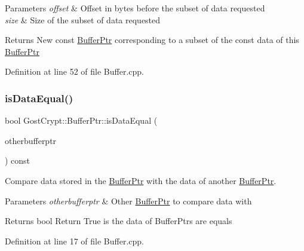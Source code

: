 \begin{DoxyParams}{Parameters}
{\em offset} & Offset in bytes before the subset of data requested \\
\hline
{\em size} & Size of the subset of data requested \\
\hline
\end{DoxyParams}
\begin{DoxyReturn}{Returns}
New const \hyperlink{class_gost_crypt_1_1_buffer_ptr}{Buffer\+Ptr} corresponding to a subset of the const data of this \hyperlink{class_gost_crypt_1_1_buffer_ptr}{Buffer\+Ptr} 
\end{DoxyReturn}


Definition at line 52 of file Buffer.\+cpp.

\mbox{\label{class_gost_crypt_1_1_buffer_ptr_aca56ffd5d6e0d9d4c1fcc10e7cde96c8}} 
\subsubsection{\texorpdfstring{is\+Data\+Equal()}{isDataEqual()}}
{\footnotesize\ttfamily bool Gost\+Crypt\+::\+Buffer\+Ptr\+::is\+Data\+Equal (\begin{DoxyParamCaption}\item[{const \hyperlink{class_gost_crypt_1_1_buffer_ptr}{Buffer\+Ptr} \&}]{otherbufferptr }\end{DoxyParamCaption}) const\hspace{0.3cm}{\ttfamily [virtual]}}



Compare data stored in the \hyperlink{class_gost_crypt_1_1_buffer_ptr}{Buffer\+Ptr} with the data of another \hyperlink{class_gost_crypt_1_1_buffer_ptr}{Buffer\+Ptr}. 


\begin{DoxyParams}{Parameters}
{\em otherbufferptr} & Other \hyperlink{class_gost_crypt_1_1_buffer_ptr}{Buffer\+Ptr} to compare data with \\
\hline
\end{DoxyParams}
\begin{DoxyReturn}{Returns}
bool Return True is the data of Buffer\+Ptrs are equals 
\end{DoxyReturn}


Definition at line 17 of file Buffer.\+cpp.

